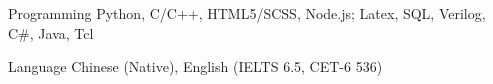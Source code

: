 


\begin{cvskills}


    \cvskill
    {Programming} %
    {Python, C/C++, HTML5/SCSS, Node.js; Latex, SQL, Verilog, C\#, Java, Tcl} %


    \cvskill
    {Language} %
    {Chinese (Native), English (IELTS 6.5, CET-6 536)} %







\end{cvskills}
